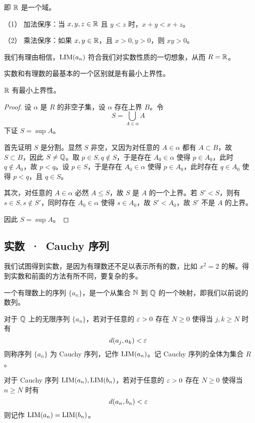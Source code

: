 即 $\RR$ 是一个域。

\begin{theorem}[$\RR$ 是有序域]
	（1） 加法保序：当 $x,y,z\in \mathbb{R}$ 且 $y<z$ 时，$x+y<x+z$。

	（2） 乘法保序：如果 $x,y\in \mathbb{R}$，且 $x>0,y>0$，则 $xy>0$。
\end{theorem}

我们有理由相信，$\operatorname{{LIM}}(a_n)$ 符合我们对实数性质的一切想象，从而 $R = \mathbb{R}$。

实数和有理数的最基本的一个区别就是有最小上界性。

\begin{theorem}
	$\RR$ 有最小上界性。
\end{theorem}
\begin{proof}
	设 $\alpha$ 是 $R$ 的非空子集，设 $\alpha$ 存在上界 $B$。令
	$$S = \bigcup_{A \in \alpha} A$$
	下证 $S = \sup A$。

	首先证明 $S$ 是分割。显然 $S$ 非空，又因为对任意的 $A\in \alpha$ 都有 $A \subset B$，故 $S \subset B$，因此 $S \ne \mathbb{Q}$。取 $p \in S,q\notin S$，于是存在 $A_0 \in \alpha$ 使得 $p \in A_0$，此时 $q \notin A_0$，故 $p<q$。设 $p \in S$，于是存在 $A_0 \in \alpha$ 使得 $p \in A_0$，此时存在 $q\in A_0$ 使得 $p < q$，且 $q \in S$。

	其次，对任意的 $A \in \alpha$ 必然 $A \leqslant S$，故 $S$ 是 $A$ 的一个上界。若 $S' < S$，则有 $s \in S, s \notin S'$，同时存在 $A_0 \in \alpha$ 使得 $s \in A_0$，故 $S' < A_0$，故 $S'$ 不是 $A$ 的上界。

	因此 $S = \sup A$。
\end{proof}

\subsection{实数\ ·\ Cauchy 序列}

我们试图得到实数，是因为有理数还不足以表示所有的数，比如 $x^2=2$ 的解。得到实数和前面的方法有所不同，要复杂的多。

一个有理数上的序列 $\{a_n\}$，是一个从集合 $\mathbb{N}$ 到 $\mathbb{Q}$ 的一个映射，即我们以前说的数列。

对于 $\mathbb{Q}$ 上的无限序列 $\{a_n\}$，若对于任意的 $\varepsilon > 0$ 存在 $N \geqslant 0$ 使得当 $j,k \geqslant N$ 时有
$$d(a_j,a_k) < \varepsilon$$
则称序列 $\{a_n\}$ 为 Cauchy 序列，记作 $\operatorname{{LIM}}(a_n)$。记 Cauchy 序列的全体为集合 $R$。

对于 Cauchy 序列 $\operatorname{{LIM}}(a_n),\operatorname{{LIM}}(b_n)$，若对于任意的 $\varepsilon > 0$ 存在 $N \geqslant 0$ 使得当 $n \geqslant N$ 时有
$$d(a_n,b_n) < \varepsilon$$
则记作 $\operatorname{{LIM}}(a_n) = \operatorname{{LIM}}(b_n)$。

